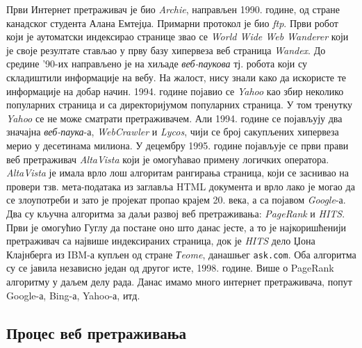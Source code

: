 Први Интернет претраживач је био \emph{Archie}, направљен 1990. године, од стране канадског студента Алана Емтејџа. Примарни протокол је био \emph{ftp}. Први робот који је аутоматски индексирао странице звао се \emph{World Wide Web Wanderer} који је своје резултате стављао у прву базу хипервеза веб страница \emph{Wandex}. До средине '90-их направљено је на хиљаде \emph{веб-паукова} тј. робота који су складиштили информације на вебу. На жалост, нису знали како да искористе те информације на добар начин. 1994. године појавио се \emph{Yahoo} као збир неколико популарних страница и са директоријумом популарних страница. У том тренутку \emph{Yahoo} се не може сматрати претраживачем. Али 1994. године се појављују два значајна \emph{веб-паука}-а, \emph{WebCrawler} и \emph{Lycos}, чији се број сакупљених хипервеза мерио у десетинама милиона. У децембру 1995. године појављује се први прави веб претраживач \emph{AltaVista} који је омогућавао примену логичких оператора. \emph{AltaVista} је имала врло лош алгоритам рангирања страница, који се заснивао на провери тзв. мета-података из заглавља HTML документа и врло лако је могао да се злоупотреби и зато је пројекат пропао крајем 20. века, а са појавом \emph{Google}-а. Два су кључна алгоритма за даљи развој веб претраживања: \emph{PageRank} и \emph{HITS}. Први је омогућио Гуглу да постане оно што данас јесте, а то је најкоришћенији претраживач са највише индексираних страница, док је \emph{HITS} дело Џона Клајнберга из IBM-а купљен од стране \emph{Тeome}, данашњег \texttt{ask.com}. Оба алгоритма су се јавила независно један од другог исте, 1998. године. Више о PageRank алгоритму у даљем делу рада. Данас имамо много интернет претраживача, попут Google-а, Bing-а, Yahoo-а, итд. \\
\subsection{Процес веб претраживања}\label{subsec:web}

